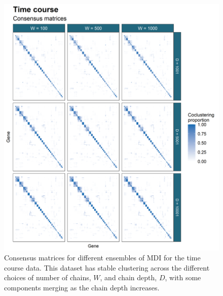 \documentclass[]{article}
\begin{document}
\begin{figure}
	\centering
	\includegraphics[scale=0.8]{./Images/Yeast/TimecourseCMcomparison.png}
	\caption{Consensus matrices for different ensembles of MDI for the time course  data. This dataset has stable clustering across the different choices of number of chains, $W$, and chain depth, $D$, with some components merging as the chain depth increases.}
	\label{fig:timecourseCMs}
\end{figure}
\end{document}
